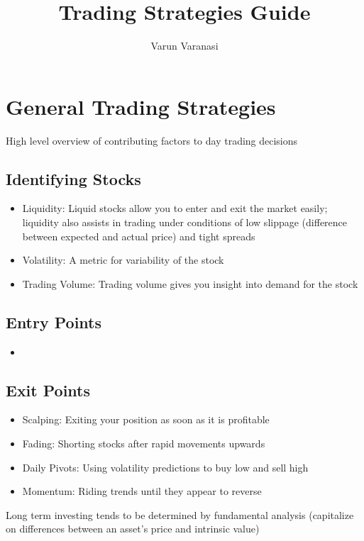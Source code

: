 \documentclass{article}
\title{Trading Strategies Guide}
\author{Varun Varanasi}
\begin{document}
\maketitle

\section{General Trading Strategies}
High level overview of contributing factors to day trading decisions

\subsection{Identifying Stocks}
\begin{itemize}
    \item Liquidity: Liquid stocks allow you to enter and exit the market easily; liquidity also assists in trading under conditions of low slippage (difference between expected and actual price) and tight spreads
    \item Volatility: A metric for variability of the stock
    \item Trading Volume: Trading volume gives you insight into demand for the stock
\end{itemize}

\subsection{Entry Points}
\begin{itemize}
    \item 
\end{itemize}

\subsection{Exit Points}
\begin{itemize}
    \item Scalping: Exiting your position as soon as it is profitable
    \item Fading: Shorting stocks after rapid movements upwards
    \item Daily Pivots: Using volatility predictions to buy low and sell high
    \item Momentum: Riding trends until they appear to reverse
\end{itemize}

Long term investing tends to be determined by fundamental analysis (capitalize on differences between an asset's price and intrinsic value)
\end{document}
